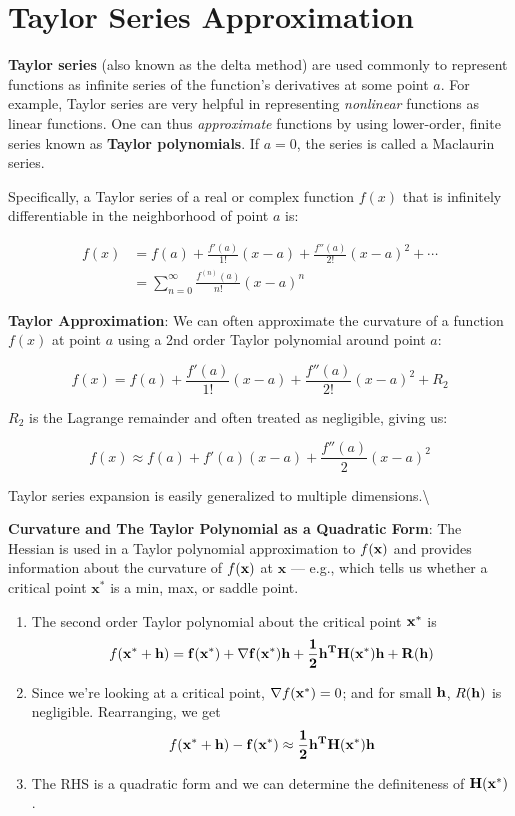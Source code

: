 \documentclass[]{book}
\newcommand{\fx}{f({\bf x})}
\theoremstyle{definition}
\theoremstyle{definition}
\theoremstyle{definition}
\theoremstyle{remark}
\begin{document}
\section{Taylor Series Approximation}\label{taylor-series-approximation}

\textbf{Taylor series} (also known as the delta method) are used
commonly to represent functions as infinite series of the function's
derivatives at some point \(a\). For example, Taylor series are very
helpful in representing \emph{nonlinear} functions as linear functions.
One can thus \emph{approximate} functions by using lower-order, finite
series known as \textbf{Taylor polynomials}. If \(a=0\), the series is
called a Maclaurin series.

Specifically, a Taylor series of a real or complex function \(f(x)\)
that is infinitely differentiable in the neighborhood of point \(a\) is:

\begin{align*}
    f(x) &= f(a) + \frac{f'(a)}{1!} (x-a) +  \frac{f''(a)}{2!} (x-a)^2 + \cdots\\
     &= \sum_{n=0}^\infty \frac{f^{(n)} (a)}{n!} (x-a)^n
\end{align*}

\textbf{Taylor Approximation}: We can often approximate the curvature of
a function \(f(x)\) at point \(a\) using a 2nd order Taylor polynomial
around point \(a\):

\[f(x) = f(a) + \frac{f'(a)}{1!} (x-a) +  \frac{f''(a)}{2!} (x-a)^2
+ R_2\]

\(R_2\) is the Lagrange remainder and often treated as negligible,
giving us:

\[f(x) \approx f(a) + f'(a)(x-a) +  \dfrac{f''(a)}{2} (x-a)^2\]

Taylor series expansion is easily generalized to multiple
dimensions.\textbackslash{}

\textbf{Curvature and The Taylor Polynomial as a Quadratic Form}: The
Hessian is used in a Taylor polynomial approximation to \(\fx\) and
provides information about the curvature of \(\fx\) at \(\bm{x}\) ---
e.g., which tells us whether a critical point \(\bm{x}^*\) is a min,
max, or saddle point.

\begin{enumerate}
  \item The second order Taylor polynomial about the critical point
${\bf x}^*$ is
  $$f({\bf x}^*+\bf h)=f({\bf x}^*)+\nabla f({\bf x}^*) \bf h +\frac{1}{2} \bf h^T
{\bf H(x^*)} \bf h + R(\bf h)$$
  \item Since we're looking at a critical point, $\nabla f({\bf x}^*)=0$;
and for small $\bf h$, $R(\bf h)$ is negligible.  Rearranging, we get
$$f({\bf x}^*+\bf h)-f({\bf x}^*)\approx \frac{1}{2} \bf h^T {\bf H(x^*)}
\bf h $$
  \item The RHS is a quadratic form and we can determine the definiteness of $\bf
H(x^*)$.
\end{enumerate}
\end{document}
